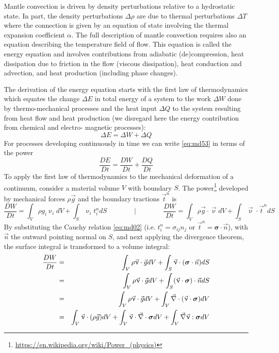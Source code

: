 Mantle convection is driven by density perturbations relative to a hydrostatic state. In
part, the density perturbations $\Delta\rho$ are due to thermal perturbations $\Delta T$ where the
connection is given by an equation of state involving the thermal expansion 
coefficient $\alpha$.
The full description of mantle convection requires also an equation describing the
temperature field of flow. This equation is called the energy equation and involves
contributions from adiabatic (de)compression, heat dissipation due to friction in the flow
(viscous dissipation), heat conduction and advection, and heat production (including
phase changes).

The derivation of the energy equation starts with the first law of thermodynamics which
equates the change $\Delta E$ in total energy of a system to the work $\Delta W$ done by 
thermo-mechanical processes and the heat input $\Delta Q$ to the system resulting from heat flow and
heat production (we disregard here the energy contribution from chemical and electro-
magnetic processes):
\begin{equation}
\Delta E = \Delta W + \Delta Q
\label{eq:md53}
\end{equation}
For processes developing continuously in time we can write \eqref{eq:md53} in terms of the power
\begin{equation}
\frac{D E}{Dt} = \frac{D W}{Dt} + \frac{D Q}{Dt}
\label{eq:md54}
\end{equation}
To apply the first law of thermodynamics to the mechanical deformation of a continuum,
consider a material volume $V$ with boundary $S$. The power\footnote{
\url{https://en.wikipedia.org/wiki/Power_(physics)}} developed by mechanical
forces $\rho \vec{g}$ and the boundary tractions $\vec{t}^n$ is
\begin{equation}
\frac{DW}{Dt} = \int_V \rho g_i \upnu_i dV + \int_S \upnu_i t_i^n  dS
\qquad
\qquad
\bigg\rvert
\qquad
\qquad
\frac{DW}{Dt} = \int_V \rho \vec{g}\cdot \vec\upnu dV 
+ \int_S \vec\upnu\cdot \vec{t}^n  dS
\label{eq:md55}
\end{equation}
By substituting the Cauchy relation \eqref{eq:md02}
(i.e. $t_i^n = \sigma_{ij}n_j$ or $\vec{t}^n={\bm \sigma}\cdot\vec{n}$), 
with $\vec{n}$ the outward pointing normal
on $S$, and next applying the divergence theorem, 
the surface integral is transformed to a volume integral:
\begin{eqnarray}
\frac{DW}{Dt} 
&=& \int_V \rho \vec{\upnu}\cdot \vec{g} dV + \int_S \vec\upnu\cdot  ({\bm \sigma} \cdot \vec{n}) dS \nonumber\\
&=& \int_V \rho \vec{\upnu}\cdot \vec{g} dV + \int_S (\vec\upnu\cdot  {\bm \sigma}) \cdot \vec{n} dS \nonumber\\
&=& \int_V \rho \vec{\upnu}\cdot \vec{g} dV + \int_V \vec\nabla \cdot ( \vec\upnu \cdot  {\bm \sigma} ) dV \nonumber\\
&=& \int_V \vec{\upnu}\cdot (\rho \vec{g}) dV 
+ \int_V \vec\upnu \cdot \vec\nabla\cdot  {\bm \sigma}  dV 
+ \int_V \vec\nabla \vec\upnu :   {\bm \sigma}  dV \nonumber
\end{eqnarray}

